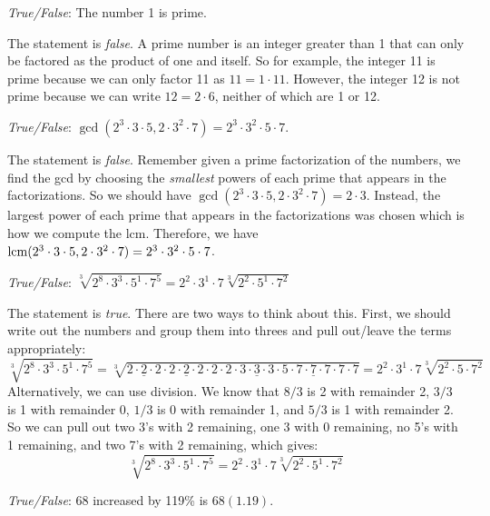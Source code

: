 \documentclass[11pt,letterpaper]{article}
\begin{document}
\thispagestyle{title}

\quizsol \textit{True/False}: The number 1 is prime. \pspace

\sol The statement is \textit{false}. A prime number is an integer greater than 1 that can only be factored as the product of one and itself. So for example, the integer 11 is prime because we can only factor 11 as $11= 1 \cdot 11$. However, the integer 12 is not prime because we can write $12= 2 \cdot 6$, neither of which are 1 or 12. \pvspace{1.5cm}



\quizsol \textit{True/False}: $\gcd(2^3 \cdot 3 \cdot 5, 2 \cdot 3^2 \cdot 7)= 2^3 \cdot 3^2 \cdot 5 \cdot 7$. \pspace

\sol The statement is \textit{false}. Remember given a prime factorization of the numbers, we find the gcd by choosing the \textit{smallest} powers of each prime that appears in the factorizations. So we should have $\gcd(2^3 \cdot 3 \cdot 5, 2 \cdot 3^2 \cdot 7)= 2 \cdot 3$. Instead, the largest power of each prime that appears in the factorizations was chosen which is how we compute the lcm. Therefore, we have $\operatorname{lcm}(2^3 \cdot 3 \cdot 5, 2 \cdot 3^2 \cdot 7)= 2^3 \cdot 3^2 \cdot 5 \cdot 7$. \pvspace{1.5cm}



\quizsol \textit{True/False}: $\sqrt[3]{2^8 \cdot 3^3 \cdot 5^1 \cdot 7^5}= 2^2 \cdot 3^1 \cdot 7 \sqrt[3]{2^2 \cdot 5^1 \cdot 7^2}$ \pspace

\sol The statement is \textit{true}. There are two ways to think about this. First, we should write out the numbers and group them into threes and pull out/leave the terms appropriately:
	\[
	\sqrt[3]{2^8 \cdot 3^3 \cdot 5^1 \cdot 7^5}= \sqrt[3]{\underline{2 \cdot 2 \cdot 2} \cdot \underline{2 \cdot 2 \cdot 2} \cdot 2 \cdot 2 \cdot \underline{3 \cdot 3 \cdot 3} \cdot 5 \cdot \underline{7 \cdot 7 \cdot 7} \cdot 7 \cdot 7}= 2^2 \cdot 3^1 \cdot 7 \sqrt[3]{2^2 \cdot 5 \cdot 7^2}
	\]
Alternatively, we can use division. We know that $8/3$ is 2 with remainder 2, $3/3$ is 1 with remainder 0, $1/3$ is 0 with remainder 1, and $5/3$ is 1 with remainder 2. So we can pull out two 3's with 2 remaining, one 3 with 0 remaining, no 5's with 1 remaining, and two 7's with 2 remaining, which gives:
	\[
	\sqrt[3]{2^8 \cdot 3^3 \cdot 5^1 \cdot 7^5}= 2^2 \cdot 3^1 \cdot 7 \sqrt[3]{2^2 \cdot 5^1 \cdot 7^2}
	\] \pvspace{1.5cm}



\quizsol \textit{True/False}: 68 increased by 119\% is $68(1.19)$. \pspace
\end{document}
